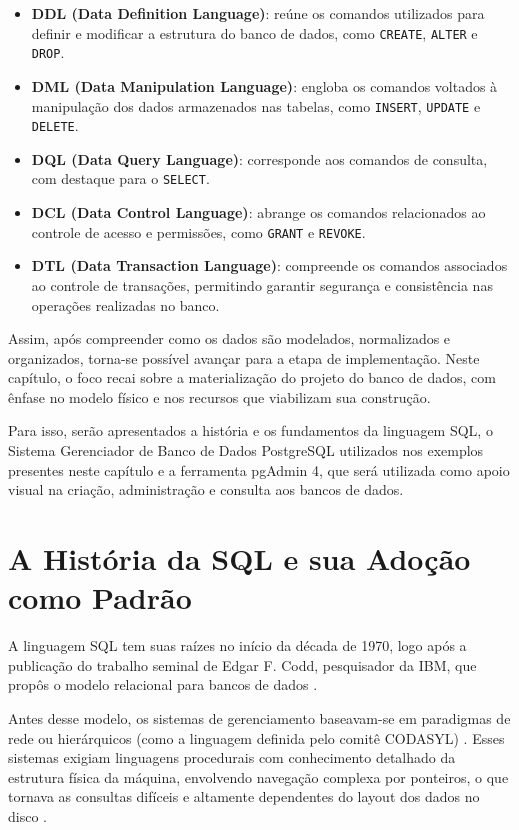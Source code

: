\begin{itemize}
    \item \textbf{DDL (Data Definition Language)}: reúne os comandos utilizados para definir e modificar a estrutura do banco de dados, como \texttt{CREATE}, \texttt{ALTER} e \texttt{DROP}.
    \item \textbf{DML (Data Manipulation Language)}: engloba os comandos voltados à manipulação dos dados armazenados nas tabelas, como \texttt{INSERT}, \texttt{UPDATE} e \texttt{DELETE}.
    \item \textbf{DQL (Data Query Language)}: corresponde aos comandos de consulta, com destaque para o \texttt{SELECT}.
    \item \textbf{DCL (Data Control Language)}: abrange os comandos relacionados ao controle de acesso e permissões, como \texttt{GRANT} e \texttt{REVOKE}.
    \item \textbf{DTL (Data Transaction Language)}: compreende os comandos associados ao controle de transações, permitindo garantir segurança e consistência nas operações realizadas no banco.
\end{itemize}

Assim, após compreender como os dados são modelados, normalizados e organizados, torna-se possível avançar para a etapa de implementação. Neste capítulo, o foco recai sobre a materialização do projeto do banco de dados, com ênfase no modelo físico e nos recursos que viabilizam sua construção. 

Para isso, serão apresentados a história e os fundamentos da linguagem SQL, o Sistema Gerenciador de Banco de Dados PostgreSQL utilizados nos exemplos presentes neste capítulo e a ferramenta pgAdmin 4, que será utilizada como apoio visual na criação, administração e consulta aos bancos de dados.

\section{A História da SQL e sua Adoção como Padrão}

A linguagem SQL tem suas raízes no início da década de 1970, logo após a publicação do trabalho seminal de Edgar F. Codd, pesquisador da IBM, que propôs o modelo relacional para bancos de dados \cite{codd1970relational}. 

Antes desse modelo, os sistemas de gerenciamento baseavam-se em paradigmas de rede ou hierárquicos (como a linguagem definida pelo comitê CODASYL) \cite{ramakrishnan2011}. Esses sistemas exigiam linguagens procedurais com conhecimento detalhado da estrutura física da máquina, envolvendo navegação complexa por ponteiros, o que tornava as consultas difíceis e altamente dependentes do layout dos dados no disco \cite{ramakrishnan2011}.

